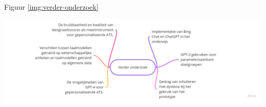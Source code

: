 \documentclass[a0,portrait]{hogent-poster}
\begin{document}
\begin{multicols}{2}
Figuur \ref{img:verder-onderzoek}

\begin{center}
	\captionsetup{type=figure}
	\includegraphics[width=1.0\linewidth]{figures/verder-onderzoek.jpg}
	\label{img:verder-onderzoek}
\end{center}


\end{multicols}
\end{document}
